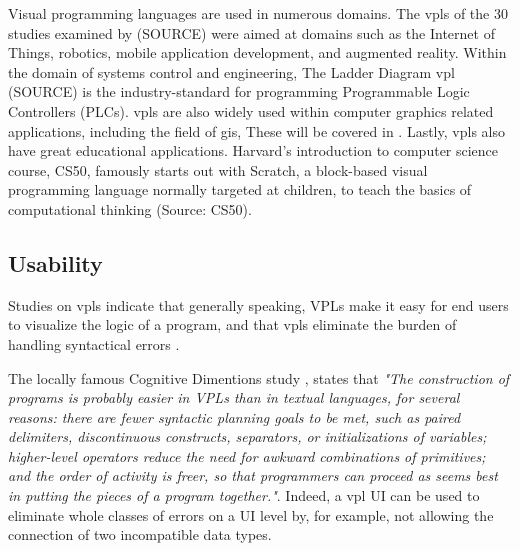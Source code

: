 Visual programming languages are used in numerous domains. 
The vpls of the 30 studies examined by (SOURCE) were aimed at domains such as the Internet of Things, robotics, mobile application development, and augmented reality. 
Within the domain of systems control and engineering, The Ladder Diagram vpl (SOURCE) is the industry-standard for programming Programmable Logic Controllers (PLCs).
\ac{vpl}s are also widely used within computer graphics related applications, including the field of \ac{gis}, 
These will be covered in .
Lastly, \ac{vpl}s also have great educational applications. 
Harvard's introduction to computer science course, CS50, famously starts out with Scratch, a block-based visual programming language normally targeted at children, to teach the basics of computational thinking (Source: CS50). 

 

\subsection{Usability}

Studies on \ac{vpl}s indicate that generally speaking, VPLs make it easy for end users to visualize the logic of a program, and that vpls eliminate the burden of handling syntactical errors \cite{kuhail_characterizing_2021}.

The locally famous Cognitive Dimentions study \cite{green_usability_1996}, states that \emph{"The construction of programs is probably easier in VPLs than in textual languages, for several reasons: 
there are fewer syntactic planning goals to be met, such as paired delimiters, discontinuous constructs, separators, or initializations of variables; 
higher-level operators reduce the need for awkward combinations of primitives; 
and the order of activity is freer, so that programmers can proceed as seems best in putting the pieces of a program together."}. 
Indeed, a vpl UI can be used to eliminate whole classes of errors on a UI level by, for example, not allowing the connection of two incompatible data types. 

